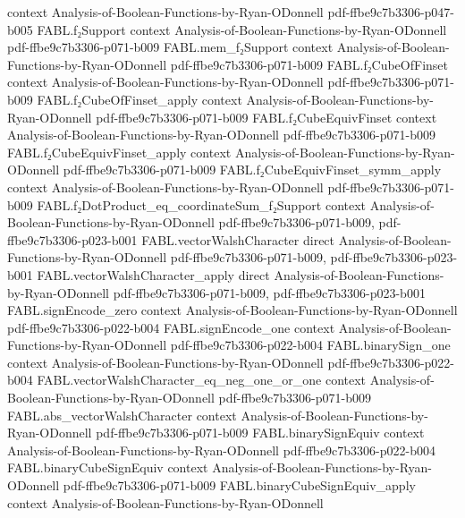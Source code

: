 \begin{theorem}
  {context}
  {Analysis-of-Boolean-Functions-by-Ryan-ODonnell}
  {pdf-ffbe9c7b3306-p047-b005}
\proofstep
  {FABL.f₂Support}
  {context}
  {Analysis-of-Boolean-Functions-by-Ryan-ODonnell}
  {pdf-ffbe9c7b3306-p071-b009}
\proofstep
  {FABL.mem_f₂Support}
  {context}
  {Analysis-of-Boolean-Functions-by-Ryan-ODonnell}
  {pdf-ffbe9c7b3306-p071-b009}
\proofstep
  {FABL.f₂CubeOfFinset}
  {context}
  {Analysis-of-Boolean-Functions-by-Ryan-ODonnell}
  {pdf-ffbe9c7b3306-p071-b009}
\proofstep
  {FABL.f₂CubeOfFinset_apply}
  {context}
  {Analysis-of-Boolean-Functions-by-Ryan-ODonnell}
  {pdf-ffbe9c7b3306-p071-b009}
\proofstep
  {FABL.f₂CubeEquivFinset}
  {context}
  {Analysis-of-Boolean-Functions-by-Ryan-ODonnell}
  {pdf-ffbe9c7b3306-p071-b009}
\proofstep
  {FABL.f₂CubeEquivFinset_apply}
  {context}
  {Analysis-of-Boolean-Functions-by-Ryan-ODonnell}
  {pdf-ffbe9c7b3306-p071-b009}
\proofstep
  {FABL.f₂CubeEquivFinset_symm_apply}
  {context}
  {Analysis-of-Boolean-Functions-by-Ryan-ODonnell}
  {pdf-ffbe9c7b3306-p071-b009}
\proofstep
  {FABL.f₂DotProduct_eq_coordinateSum_f₂Support}
  {context}
  {Analysis-of-Boolean-Functions-by-Ryan-ODonnell}
  {pdf-ffbe9c7b3306-p071-b009,
    pdf-ffbe9c7b3306-p023-b001}
\proofstep
  {FABL.vectorWalshCharacter}
  {direct}
  {Analysis-of-Boolean-Functions-by-Ryan-ODonnell}
  {pdf-ffbe9c7b3306-p071-b009,
    pdf-ffbe9c7b3306-p023-b001}
\proofstep
  {FABL.vectorWalshCharacter_apply}
  {direct}
  {Analysis-of-Boolean-Functions-by-Ryan-ODonnell}
  {pdf-ffbe9c7b3306-p071-b009,
    pdf-ffbe9c7b3306-p023-b001}
\proofstep
  {FABL.signEncode_zero}
  {context}
  {Analysis-of-Boolean-Functions-by-Ryan-ODonnell}
  {pdf-ffbe9c7b3306-p022-b004}
\proofstep
  {FABL.signEncode_one}
  {context}
  {Analysis-of-Boolean-Functions-by-Ryan-ODonnell}
  {pdf-ffbe9c7b3306-p022-b004}
\proofstep
  {FABL.binarySign_one}
  {context}
  {Analysis-of-Boolean-Functions-by-Ryan-ODonnell}
  {pdf-ffbe9c7b3306-p022-b004}
\proofstep
  {FABL.vectorWalshCharacter_eq_neg_one_or_one}
  {context}
  {Analysis-of-Boolean-Functions-by-Ryan-ODonnell}
  {pdf-ffbe9c7b3306-p071-b009}
\proofstep
  {FABL.abs_vectorWalshCharacter}
  {context}
  {Analysis-of-Boolean-Functions-by-Ryan-ODonnell}
  {pdf-ffbe9c7b3306-p071-b009}
\proofstep
  {FABL.binarySignEquiv}
  {context}
  {Analysis-of-Boolean-Functions-by-Ryan-ODonnell}
  {pdf-ffbe9c7b3306-p022-b004}
\proofstep
  {FABL.binaryCubeSignEquiv}
  {context}
  {Analysis-of-Boolean-Functions-by-Ryan-ODonnell}
  {pdf-ffbe9c7b3306-p071-b009}
\proofstep
  {FABL.binaryCubeSignEquiv_apply}
  {context}
  {Analysis-of-Boolean-Functions-by-Ryan-ODonnell}

\end{theorem}
